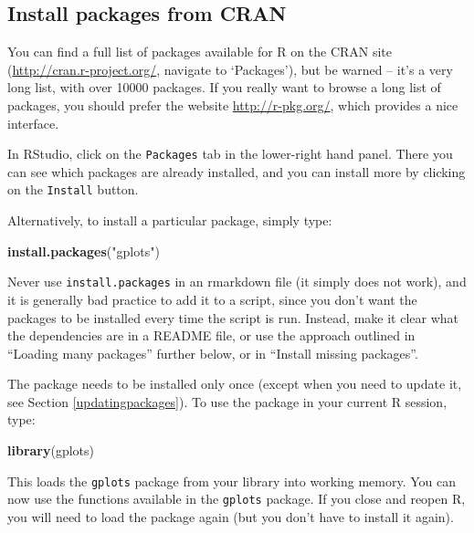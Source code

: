 \documentclass[]{book}
\newenvironment{Shaded}{\begin{snugshade}}{\end{snugshade}}
\newcommand{\KeywordTok}[1]{\textcolor[rgb]{0.13,0.29,0.53}{\textbf{#1}}}
\newcommand{\NormalTok}[1]{#1}
\newcommand{\StringTok}[1]{\textcolor[rgb]{0.31,0.60,0.02}{#1}}
\let\BeginKnitrBlock\begin \let\EndKnitrBlock\end
\begin{document}
\hypertarget{install-packages-from-cran}{%
\subsection{Install packages from CRAN}\label{install-packages-from-cran}}

You can find a full list of packages available for R on the CRAN site (\url{http://cran.r-project.org/}, navigate to `Packages'), but be warned -- it's a very long list, with over 10000 packages. If you really want to browse a long list of packages, you should prefer the website \url{http://r-pkg.org/}, which provides a nice interface.

In RStudio, click on the \texttt{Packages} tab in the lower-right hand panel. There you can see which packages are already installed, and you can install more by clicking on the \texttt{Install} button.

Alternatively, to install a particular package, simply type:

\begin{Shaded}
\begin{Highlighting}[]
\KeywordTok{install.packages}\NormalTok{(}\StringTok{"gplots"}\NormalTok{)}
\end{Highlighting}
\end{Shaded}

\BeginKnitrBlock{rmdcaution}
Never use \texttt{install.packages} in an rmarkdown file (it simply does not work), and it is generally bad practice to add it to a script, since you don't want the packages to be installed every time the script is run. Instead, make it clear what the dependencies are in a README file, or use the approach outlined in ``Loading many packages'' further below, or in ``Install missing packages''.
\EndKnitrBlock{rmdcaution}

The package needs to be installed only once (except when you need to update it, see Section \ref{updatingpackages}). To use the package in your current R session, type:

\begin{Shaded}
\begin{Highlighting}[]
\KeywordTok{library}\NormalTok{(gplots)}
\end{Highlighting}
\end{Shaded}

This loads the \texttt{gplots} package from your library into working memory. You can now use the functions available in the \texttt{gplots} package. If you close and reopen R, you will need to load the package again (but you don't have to install it again).
\end{document}
